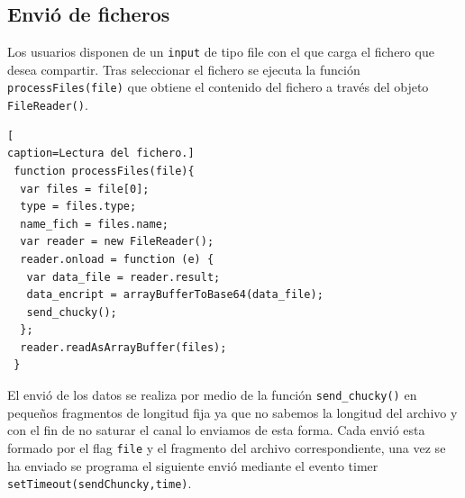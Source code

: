 \subsection*{Envió de ficheros}
Los usuarios disponen de un \texttt{input} de tipo file con el que carga el fichero que desea compartir. Tras seleccionar el fichero se ejecuta la función \texttt{processFiles(file)} que obtiene el contenido del fichero a través del objeto \texttt{FileReader()}. 
\begin{lstlisting}[
caption=Lectura del fichero.]
 function processFiles(file){
  var files = file[0];
  type = files.type;
  name_fich = files.name;
  var reader = new FileReader();
  reader.onload = function (e) {
   var data_file = reader.result;
   data_encript = arrayBufferToBase64(data_file);
   send_chucky();
  };
  reader.readAsArrayBuffer(files);
 }
\end{lstlisting}

El envió de los datos se realiza por medio de la función \texttt{send\_chucky()} en pequeños fragmentos de longitud fija ya que no sabemos la longitud del archivo y con el fin de no saturar el canal lo enviamos de esta forma. Cada envió esta formado por el flag \texttt{file} y el fragmento del archivo correspondiente, una vez se ha enviado se programa el siguiente envió mediante el evento timer \texttt{setTimeout(sendChuncky,time)}.

